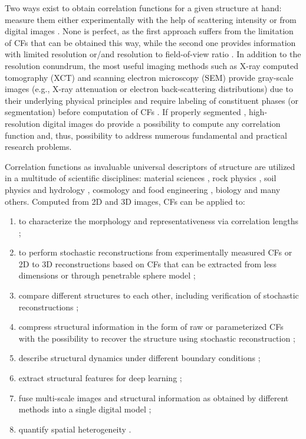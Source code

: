 \documentclass[reprint,amsmath,amssymb,aps,pre,showkeys,showpacs,nofootinbib]{revtex4-1}
\begin{document}
Two ways exist to obtain correlation functions for a given structure at hand:
measure them either experimentally with the help of scattering intensity \cite{debye1957scattering,li2018direct} or
from digital images \cite{berryman1985measurement,ma2018SS}. None is perfect, as the first approach suffers from the
limitation of CFs that can be obtained this way, while the second one provides
information with limited resolution or/and resolution to field-of-view ratio \cite{gerke2015universal}. In
addition to the resolution conundrum, the most useful imaging methods such as
X-ray computed tomography (XCT) and scanning electron microscopy (SEM) provide
gray-scale images (e.g., X-ray attenuation or electron back-scattering
distributions) due to their underlying physical principles and require labeling
of constituent phases (or segmentation) before computation of
CFs \cite{samarin2023robust}. If properly segmented \cite{NNseg}, high-resolution digital images do provide a
possibility to compute any correlation function and, thus, possibility to
address numerous fundamental and practical research problems.

Correlation functions as invaluable universal descriptors of structure are
utilized in a multitude of scientific disciplines: material sciences \cite{hasanabadi20163d,Havelka,feng2018reconstruction,chen2022quantifying}, rock
physics \cite{ledesma2018effect}, soil physics and hydrology \cite{PLoS_ONE,KarsaninaEJSS}, cosmology and food engineering \cite{TakadaJain,Derossi2019}, biology \cite{veatch2012correlation} and
many others. Computed from 2D and 3D images, CFs can be applied to:
\begin{enumerate}
  \item to characterize the morphology and representativeness via correlation
    lengths \cite{vcapek2009stochastic,thovert2011grain,tensorPRE};
  \item to perform stochastic reconstructions from experimentally measured CFs
    or 2D to 3D reconstructions based on CFs that can be extracted from less
    dimensions or through penetrable sphere model \cite{Adler_recon,Y-T,tahmasebiPRL,hasanabadi20163d,karsaninaPRL};
  \item compare different structures to each other, including verification of
    stochastic reconstructions \cite{vcapek2009stochastic,tahmasebiPRL,EPL2};
  \item compress structural information in the form of raw or parameterized CFs
    with the possibility to recover the structure using stochastic
    reconstruction \cite{SciRep1,Havelka,KarsaninaEJSS};
  \item describe structural dynamics under different boundary conditions \cite{chen2015dynamic,xu2022correlation,fomin2023soil};
  \item extract structural features for deep learning \cite{pilania2017multi,kamrava2020linking,roding2020predicting,KarsaninaEJSS};
  \item fuse multi-scale images and structural information as obtained by
    different methods into a single digital model \cite{Geoderma2018};
  \item quantify spatial heterogeneity \cite{zhang2000pore,REVpaper}.
\end{enumerate}
\end{document}
